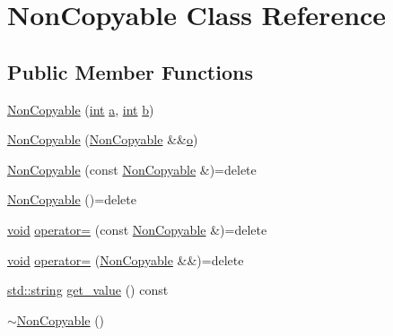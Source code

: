 \hypertarget{class_non_copyable}{}\section{Non\+Copyable Class Reference}
\label{class_non_copyable}
\subsection*{Public Member Functions}
\begin{DoxyCompactItemize}
\item 
\mbox{\hyperlink{class_non_copyable_a252041bb00ecb92d28d5ec2583a506a0}{Non\+Copyable}} (\mbox{\hyperlink{warnings_8h_a74f207b5aa4ba51c3a2ad59b219a423b}{int}} \mbox{\hyperlink{_s_d_l__opengl__glext_8h_a3309789fc188587d666cda5ece79cf82}{a}}, \mbox{\hyperlink{warnings_8h_a74f207b5aa4ba51c3a2ad59b219a423b}{int}} \mbox{\hyperlink{_s_d_l__opengl__glext_8h_a0f71581a41fd2264c8944126dabbd010}{b}})
\item 
\mbox{\hyperlink{class_non_copyable_a94e3e3c37705261ef68ef062940633b7}{Non\+Copyable}} (\mbox{\hyperlink{class_non_copyable}{Non\+Copyable}} \&\&\mbox{\hyperlink{abstract_8h_a70a0763575096c5545f2232a32ec302a}{o}})
\item 
\mbox{\hyperlink{class_non_copyable_a501d34ffcc34b30de6d541887a901057}{Non\+Copyable}} (const \mbox{\hyperlink{class_non_copyable}{Non\+Copyable}} \&)=delete
\item 
\mbox{\hyperlink{class_non_copyable_acaf21c23c4f44d693d603b0b8abbdb39}{Non\+Copyable}} ()=delete
\item 
\mbox{\hyperlink{_s_d_l__opengles2__gl2ext_8h_ae5d8fa23ad07c48bb609509eae494c95}{void}} \mbox{\hyperlink{class_non_copyable_aaf9b12dcaae80c9d304df7a941d4e21f}{operator=}} (const \mbox{\hyperlink{class_non_copyable}{Non\+Copyable}} \&)=delete
\item 
\mbox{\hyperlink{_s_d_l__opengles2__gl2ext_8h_ae5d8fa23ad07c48bb609509eae494c95}{void}} \mbox{\hyperlink{class_non_copyable_a32e47f60a7c07436b9801f4d341eac3d}{operator=}} (\mbox{\hyperlink{class_non_copyable}{Non\+Copyable}} \&\&)=delete
\item 
\mbox{\hyperlink{_s_d_l__opengl__glext_8h_ab4ccfaa8ab0e1afaae94dc96ef52dde1}{std\+::string}} \mbox{\hyperlink{class_non_copyable_ab6bc56160dc150a423d931281582ace7}{get\+\_\+value}} () const
\item 
\mbox{\hyperlink{class_non_copyable_a41c964e648935f908b8fa28499c27527}{$\sim$\+Non\+Copyable}} ()
\end{DoxyCompactItemize}


